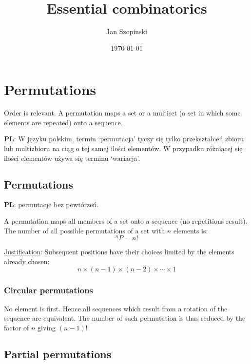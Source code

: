 \documentclass{article}
\newcommand{\pl}{\textbf{PL}: }
\begin{document}
\title{Essential combinatorics}
\author{Jan Szopinski}
\date{\frontdate\today}
\maketitle

\section{Permutations}

Order is relevant. A permutation maps a set or a multiset (a set in which some elements are repeated) onto a sequence.

\begin{otherlanguage}{polish}
    \pl
    W języku polskim, termin `permutacja' tyczy się tylko przekształceń zbioru lub multizbioru na ciąg o tej samej ilości elementów.
    W przypadku różniącej się ilości elementów używa się terminu `wariacja'.
\end{otherlanguage}

\subsection{Permutations}

\foreignlanguage{polish}{\pl permutacje bez powtórzeń.}

A permutation maps all members of a set onto a sequence (no repetitions result).
The number of all possible permutations of a set with $n$ elements is:
%
\begin{equation}
    ^nP = n!
\end{equation}

\underline{Justification}:
Subsequent positions have their choices limited by the elements already chosen:
%
\begin{equation*}
    n\times(n-1)\times(n-2)\times \dotsb \times 1
\end{equation*}

\subsubsection{Circular permutations}

No element is first.
Hence all sequences which result from a rotation of the sequence are equivalent.
The number of such permutation is thus reduced by the factor of $n$ giving ${(n-1)!}$

\subsection{Partial permutations}
\end{document}
